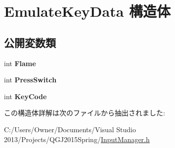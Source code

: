 \hypertarget{struct_emulate_key_data}{}\section{Emulate\+Key\+Data 構造体}
\label{struct_emulate_key_data}
\subsection*{公開変数類}
\begin{DoxyCompactItemize}
\item 
int {\bfseries Flame}\hypertarget{struct_emulate_key_data_af83001e54274cbe6cbbb0573494ad2e7}{}\label{struct_emulate_key_data_af83001e54274cbe6cbbb0573494ad2e7}

\item 
int {\bfseries Press\+Switch}\hypertarget{struct_emulate_key_data_a45f86e48e5bbe5274e32c774ad7b335b}{}\label{struct_emulate_key_data_a45f86e48e5bbe5274e32c774ad7b335b}

\item 
int {\bfseries Key\+Code}\hypertarget{struct_emulate_key_data_af8584b56d273b56e970ee810f7314272}{}\label{struct_emulate_key_data_af8584b56d273b56e970ee810f7314272}

\end{DoxyCompactItemize}


この構造体詳解は次のファイルから抽出されました\+:\begin{DoxyCompactItemize}
\item 
C\+:/\+Users/\+Owner/\+Documents/\+Visual Studio 2013/\+Projects/\+Q\+G\+J2015\+Spring/\hyperlink{_input_manager_8h}{Input\+Manager.\+h}\end{DoxyCompactItemize}
